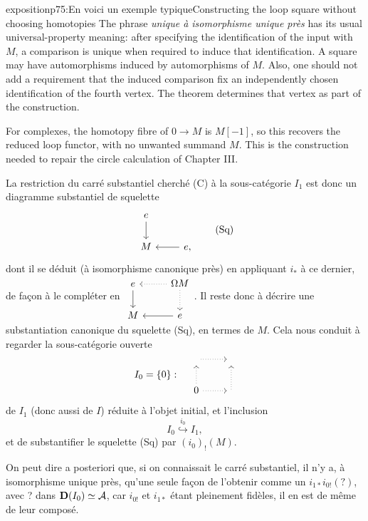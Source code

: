 \begin{dcomment}{exposition}{p75:En voici un exemple typique}{Constructing the loop square without choosing homotopies}
The phrase \emph{unique à isomorphisme unique près} has its usual universal-property meaning: after specifying the identification of the input with \(M\), a comparison is unique when required to induce that identification. A square may have automorphisms induced by automorphisms of \(M\). Also, one should not add a requirement that the induced comparison fix an independently chosen identification of the fourth vertex. The theorem determines that vertex as part of the construction.

For complexes, the homotopy fibre of \(0\to M\) is \(M[-1]\), so this recovers the reduced loop functor, with no unwanted summand \(M\). This is the construction needed to repair the circle calculation of Chapter III.
\end{dcomment}



La restriction du carré substantiel cherché (C) à la sous-catégorie $I_1$ est donc un diagramme substantiel de squelette
\[
\begin{tikzcd}
e \arrow[d] \\
M & e, \arrow[l]
\end{tikzcd}
\tag*{(Sq)}
\]
dont il se déduit (à isomorphisme canonique près) en appliquant $i_*$ à ce dernier, de façon à le compléter en $\begin{tikzcd}
e \arrow[d] & \Omega M \arrow[l, dotted] \arrow[d, dotted] \\
M & e \arrow[l]
\end{tikzcd}$. Il reste donc à décrire une substantiation canonique du squelette (Sq), en termes de $M$. Cela nous conduit à regarder la sous-catégorie ouverte
\[
I_0 = \{0\} :\quad
\begin{tikzcd}
{} \arrow[r, dotted] & {} \\
0 \arrow[u, dotted] \arrow[r, dotted] & {} \arrow[u, dotted]
\end{tikzcd}
\]
de $I_1$ (donc aussi de $I$) réduite à l'objet initial, et l'inclusion
\[
I_0 \overset{i_0}{\hookrightarrow} I_1,
\]
et de substantifier le squelette (Sq) par $(i_0)_!(M)$.

On peut dire a posteriori que, si on connaissait le carré substantiel, il n'y a, à isomorphisme unique près, qu'une seule façon de l'obtenir comme un $i_{1*}i_{0!}(?)$, avec ? dans $\mathbf{D}(I_0)\simeq\mathcal{A}$, car $i_{0!}$ et $i_{1*}$ étant pleinement fidèles, il en est de même de leur composé.


